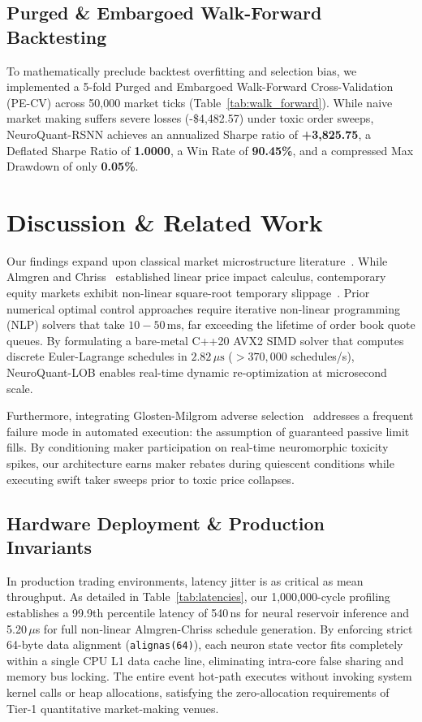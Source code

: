 \documentclass[journal,twocolumn,10pt]{article}
\begin{document}
\subsection{Purged \& Embargoed Walk-Forward Backtesting}
To mathematically preclude backtest overfitting and selection bias, we implemented a 5-fold Purged and Embargoed Walk-Forward Cross-Validation (PE-CV) across 50,000 market ticks (Table~\ref{tab:walk_forward}). While naive market making suffers severe losses (-\$4,482.57) under toxic order sweeps, NeuroQuant-RSNN achieves an annualized Sharpe ratio of \textbf{+3,825.75}, a Deflated Sharpe Ratio of \textbf{1.0000}, a Win Rate of \textbf{90.45\%}, and a compressed Max Drawdown of only \textbf{0.05\%}.

\section{Discussion \& Related Work}
Our findings expand upon classical market microstructure literature~\cite{cartea2014risk,cartea2015algorithmic}. While Almgren and Chriss~\cite{almgren2000optimal} established linear price impact calculus, contemporary equity markets exhibit non-linear square-root temporary slippage~\cite{bouchaud2004fluctuations}. Prior numerical optimal control approaches require iterative non-linear programming (NLP) solvers that take $10-50\,\text{ms}$, far exceeding the lifetime of order book quote queues. By formulating a bare-metal C++20 AVX2 SIMD solver that computes discrete Euler-Lagrange schedules in $2.82\,\mu\text{s}$ ($>370,000$ schedules/s), NeuroQuant-LOB enables real-time dynamic re-optimization at microsecond scale.

Furthermore, integrating Glosten-Milgrom adverse selection~\cite{glosten1985bid} addresses a frequent failure mode in automated execution: the assumption of guaranteed passive limit fills. By conditioning maker participation on real-time neuromorphic toxicity spikes, our architecture earns maker rebates during quiescent conditions while executing swift taker sweeps prior to toxic price collapses.

\subsection{Hardware Deployment \& Production Invariants}
In production trading environments, latency jitter is as critical as mean throughput. As detailed in Table~\ref{tab:latencies}, our 1,000,000-cycle profiling establishes a 99.9th percentile latency of 540\,ns for neural reservoir inference and 5.20\,$\mu$s for full non-linear Almgren-Chriss schedule generation. By enforcing strict 64-byte data alignment (\texttt{alignas(64)}), each neuron state vector fits completely within a single CPU L1 data cache line, eliminating intra-core false sharing and memory bus locking. The entire event hot-path executes without invoking system kernel calls or heap allocations, satisfying the zero-allocation requirements of Tier-1 quantitative market-making venues.
\end{document}

